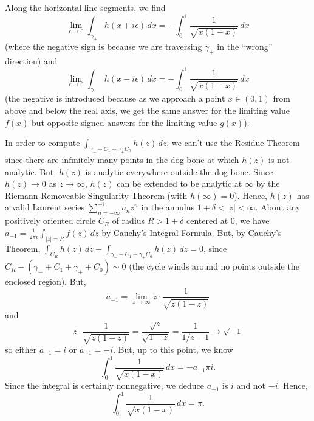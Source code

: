 \documentclass[11pt]{book}
\theoremstyle{definition}
\begin{document}
\begin{enumerate}
        Along the horizontal line segments, we find 
        \[ \lim_{\epsilon \to 0} \int_{\gamma_+} h(x + i\epsilon) \, dx = -\int_0^1 \frac{1}{\sqrt{x(1-x)}} \, dx \] (where the negative sign is because we are traversing $\gamma_+$ in the ``wrong'' direction) and 
        \[ \lim_{\epsilon \to 0} \int_{\gamma_-}  h(x-i\epsilon) \, dx = -\int_0^1 \frac{1}{\sqrt{x(1-x)}} \, dx \]  (the negative is introduced because as we approach a point  $x\in (0,1)$ from above and below the real axis, we get the same answer for the limiting value $f(x)$ but opposite-signed answers for the limiting value $g(x)$).  


        In order to compute $\int_{\gamma_- + C_1 + \gamma_+ C_0} h(z) \, dz$, we can't use the Residue Theorem since there are infinitely many points in the dog bone at which $h(z)$ is not analytic.   But, $h(z)$ is analytic everywhere outside the dog bone.   Since $h(z) \to 0$ as $z\to \infty$, $h(z)$ can be extended to be analytic at $\infty$ by the Riemann Removeable Singularity Theorem (with $h(\infty) = 0$).   Hence, $h(z)$ has a valid Laurent series $\sum_{n=-\infty}^{-1} a_n z^n$  in the annulus $1 + \delta < |z| < \infty$.   About any positively oriented circle $C_R$ of radius $R>1+\delta$ centered at $0$, we have $a_{-1} = \frac{1}{2\pi i} \int_{|z|=R} f(z) \, dz$ by Cauchy's Integral Formula.   But, by Cauchy's Theorem, $\int_{C_R} h(z) \, dz - \int_{\gamma_- + C_1 + \gamma_+ C_0} h(z) \, dz = 0$, since $C_R - (\gamma_- + C_1 + \gamma_+ + C_0) \sim 0$ (the  cycle winds around no points outside the enclosed region).   But, 
        \[ a_{-1} = \lim_{z\to \infty} z \cdot \frac{1}{\sqrt{z(1-z)}} \] and 
        \[ z \cdot \frac{1}{\sqrt{z(1-z)}} = \frac{\sqrt{z}}{\sqrt{1-z}} = \frac{1}{1/z - 1} \to \sqrt{-1} \]  so either $a_{-1} = i$ or $a_{-1} = -i$.  But, up to this point, we know
        \[ \int_0^1 \frac{1}{\sqrt{x(1-x)}} \, dx = -a_{-1} \pi i.\]  Since the integral is certainly nonnegative, we deduce $a_{-1}$ is $i$ and not $-i$.  Hence, 
        \[ \int_0^1 \frac{1}{\sqrt{x(1-x)}} \, dx = \pi. \]



\end{enumerate}
\end{document}
